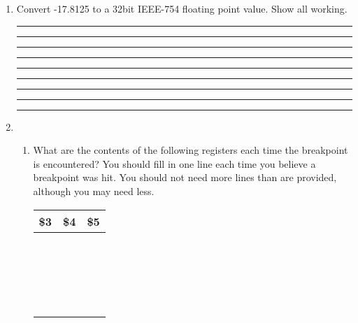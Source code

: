 \documentclass[a4paper,10pt]{article}
\begin{document}
\begin{enumerate}
\newpage
\item Convert -17.8125 to a 32bit IEEE-754 floating point value. Show
all working.
\vspace{3mm}\hrule\vspace{7mm}\hrule\vspace{7mm}\hrule\vspace{7mm}\hrule\vspace{7mm}
\hrule\vspace{7mm}\hrule\vspace{7mm}\hrule\vspace{7mm}\hrule\vspace{7mm}
\hrule\vspace{3mm}

\item \begin{enumerate}
\item What are the contents of the following registers each time the
breakpoint is encountered? You should fill in one line each time you
believe a breakpoint was hit. You should not need more lines than are
provided, although you may need less.
\begin{center}
\begin{tabular}{|c|c|c|}
\hline\hspace{10mm}\textbf{\$3}\hspace{10mm} & \hspace{10mm}\textbf{\$4}\hspace{10mm} & \hspace{10mm}\textbf{\$5}\hspace{10mm} \\
\hline & & \\ & & \\
\hline & & \\ & & \\
\hline & & \\ & & \\
\hline & & \\ & & \\
\hline & & \\ & & \\
\hline & & \\ & & \\
\hline & & \\ & & \\
\hline & & \\ & & \\
\hline & & \\ & & \\
\hline & & \\ & & \\
\hline
\end{tabular}
\end{center}


\end{enumerate}
\end{enumerate}
\end{document}
